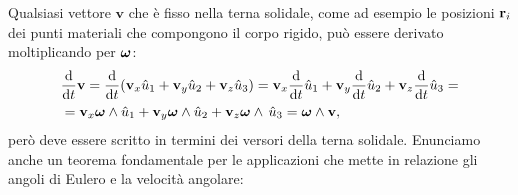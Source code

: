     Qualsiasi vettore $\mathbf{v}$ che è fisso nella terna solidale, come ad esempio le posizioni $\mathbf{r}_i$ dei punti materiali che compongono il corpo rigido, può essere derivato moltiplicando per $\boldsymbol{\omega}$:
    \begin{equation}
    \begin{aligned}
        &\frac{\mathrm{d}}{\mathrm{d}t} \mathbf{v} = \frac{\mathrm{d}}{\mathrm{d}t}(\mathbf{v}_x\hat{u}_1+\mathbf{v}_y\hat{u}_2+\mathbf{v}_z\hat{u}_3) = \mathbf{v}_x\frac{\mathrm{d}}{\mathrm{d}t} \hat{u}_1+\mathbf{v}_y\frac{\mathrm{d}}{\mathrm{d}t} \hat{u}_2+\mathbf{v}_z\frac{\mathrm{d}}{\mathrm{d}t} \hat{u}_3= \\
        &=\mathbf{v}_x\boldsymbol{\omega}\wedge\hat{u}_1+\mathbf{v}_y\boldsymbol{\omega}\wedge \hat{u}_2+\mathbf{v}_z\boldsymbol{\omega} \wedge\,\hat{u}_3 = \boldsymbol{\omega} \wedge \mathbf{v},
    \end{aligned}
    \end{equation}
    però deve essere scritto in termini dei versori della terna solidale. Enunciamo anche un teorema fondamentale per le applicazioni che mette in relazione gli angoli di Eulero e la velocità angolare:

